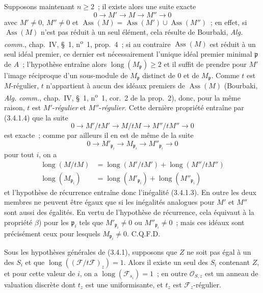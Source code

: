 Supposons maintenant $n\geqslant2$~; il existe alors une suite exacte
\[
0\longrightarrow M'\longrightarrow M\longrightarrow M''\longrightarrow0
\]
avec $M'\neq0$, $M''\neq0$ et
$\operatorname{Ass}(M)=\operatorname{Ass}(M')\cup\operatorname{Ass}(M'')$~;
en effet, si $\operatorname{Ass}(M)$ n'est pas réduit à un seul élément, cela
résulte de Bourbaki, \emph{Alg. comm.}, chap.~IV, \S~1,
n\textsuperscript{o}~1, prop.~4~; si au contraire $\operatorname{Ass}(M)$ est
réduit à un seul idéal premier, ce dernier est nécessairement l'unique idéal
premier minimal $\mathfrak p$ de $A$~; l'hypothèse entraîne alors
$\operatorname{long}(M_{\mathfrak p})\geqslant2$ et il suffit de prendre pour
$M'$ l'image réciproque d'un sous-module de $M_{\mathfrak p}$ distinct de $0$
et de $M_{\mathfrak p}$. Comme $t$ est $M$-régulier, $t$ n'appartient à aucun
des idéaux premiers de $\operatorname{Ass}(M)$ (Bourbaki,
\emph{Alg. comm.}, chap.~IV, \S~1, n\textsuperscript{o}~1, cor.~2 de la
prop.~2), donc, pour la même raison, $t$ est $M'$-\emph{régulier} et
$M''$-\emph{régulier}. Cette dernière propriété entraîne par (3.4.1.4) que la suite
\[
0\longrightarrow M'/tM'\longrightarrow M/tM
\longrightarrow M''/tM''\longrightarrow0
\]
est exacte~; comme par ailleurs il en est de même de la suite
\[
0\longrightarrow M'_{\mathfrak p_i}\longrightarrow M_{\mathfrak p_i}
\longrightarrow M''_{\mathfrak p_i}\longrightarrow0
\]
pour tout $i$, on a
\[
\begin{aligned}
\operatorname{long}(M/tM)
&=\operatorname{long}(M'/tM')+\operatorname{long}(M''/tM'')\\
\operatorname{long}(M_{\mathfrak p_i})
&=\operatorname{long}(M'_{\mathfrak p_i})
 +\operatorname{long}(M''_{\mathfrak p_i})
\end{aligned}
\]
et l'hypothèse de récurrence entraîne donc l'inégalité (3.4.1.3). En outre
les deux membres ne peuvent être égaux que si les inégalités analogues pour
$M'$ et $M''$ sont aussi des égalités. En vertu de l'hypothèse de récurrence,
cela équivaut à la propriété $\beta$) pour les $\mathfrak p_i$ tels que
$M'_{\mathfrak p_i}\neq0$ ou $M''_{\mathfrak p_i}\neq0$~; mais ces idéaux sont
précisément ceux pour lesquels $M_{\mathfrak p_i}\neq0$. C.Q.F.D.


\begin{corollary}[3.4.2]
\label{IV.2.3.4.2-fr}
Sous les hypothèses générales de \textup{(3.4.1)}, supposons que $Z$ ne soit pas égal
à un des $S_i$ et que
$\operatorname{long}((\mathcal F/t\mathcal F)_z)=1$. Alors il existe un seul
des $S_i$ contenant $Z$, et pour cette valeur de $i$, on a
$\operatorname{long}(\mathcal F_{s_i})=1$~; en outre
$\mathcal O_{S,z}$ est un anneau de valuation discrète dont $t_z$ est une
uniformisante, et $t_z$ est $\mathcal F_z$-régulier.
\end{corollary}

